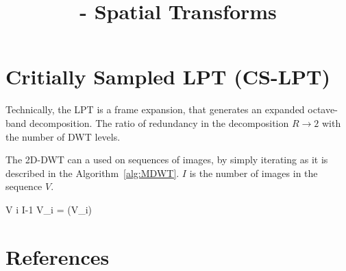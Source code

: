 
\title{\SM{} - Spatial Transforms}

\maketitle

\tableofcontents

\section{Critially Sampled LPT (CS-LPT)}

Technically, the LPT is a frame expansion, that generates an expanded
octave-band decomposition. The ratio of redundancy in the
decomposition $R\rightarrow 2$ with the number of DWT levels.

The 2D-DWT can a used on sequences of images, by simply iterating as
it is described in the Algorithm~\ref{alg:MDWT}. $I$ is the number of
images in the sequence $V$.

\begin{pseudocode}{}{V}
  \label{alg:MDWT}
  \FOR i  \TO I-1 \DO
  V_i = (V_i)
\end{pseudocode}


\section{References}

\renewcommand{\addcontentsline}[3]{}%

